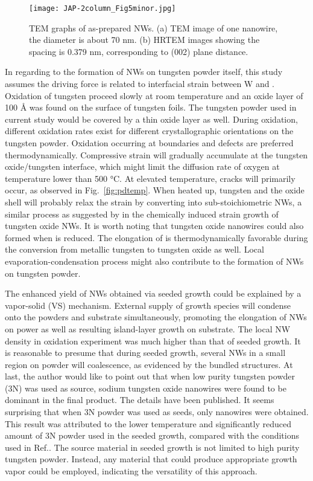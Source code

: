 \begin{figure}[htb]
\centering
\texttt{[image: JAP-2column\_Fig5minor.jpg]}
\caption[Characterization of : TEM cont]{TEM graphs of as-prepared NWs. (a) TEM image of one nanowire, the diameter is about 70 nm. (b) HRTEM images showing the spacing is 0.379 nm, corresponding to (002) plane distance.}
\label{fig:woseedtem2}
\end{figure}

In regarding to the formation of NWs on tungsten powder itself, this study assumes the driving force is related to interfacial strain between W and . Oxidation of tungsten proceed slowly at room temperature and an oxide layer of 100 \si{\angstrom} was found on the surface of tungsten foils.\cite{Warren1996} The tungsten powder used in current study would be covered by a thin oxide layer as well. During oxidation, different oxidation rates exist for different crystallographic orientations on the tungsten powder. Oxidation occurring at boundaries and defects are preferred thermodynamically.\cite{You2010} Compressive strain will gradually accumulate at the tungsten oxide/tungsten interface, which might limit the diffusion rate of oxygen at temperature lower than 500 \si{\degreeCelsius}.\cite{tungsten1999} At elevated temperature, cracks will primarily occur, as observed in Fig.~\ref{fig:pdtemp}. When heated up, tungsten and the oxide shell will probably relax the strain by converting into sub-stoichiometric NWs, a similar process as suggested by \citeauthor{Klinke2005} in the chemically induced strain growth of tungsten oxide NWs.\cite{Klinke2005} It is worth noting that tungsten oxide nanowires could also formed when  is reduced.\cite{Sarin1975} The elongation of  is thermodynamically favorable during the conversion from metallic tungsten to tungsten oxide as well. Local evaporation-condensation process might also contribute to the formation of NWs on tungsten powder.

The enhanced yield of NWs obtained via seeded growth could be explained by a vapor-solid (VS) mechanism. External supply of growth species will condense onto the powders and substrate simultaneously, promoting the elongation of NWs on power as well as resulting island-layer growth on substrate. The local NW density in oxidation experiment was much higher than that of seeded growth. It is reasonable to presume that during seeded growth, several NWs in a small region on powder will coalescence, as evidenced by the bundled structures. At last, the author would like to point out that when low purity tungsten powder (3N) was used as source, sodium tungsten oxide nanowires were found to be dominant in the final product. The details have been published.\cite{Sheng2014} It seems surprising that when 3N powder was used as seeds, only  nanowires were obtained. This result was attributed to the lower temperature and significantly reduced amount of 3N powder used in the seeded growth, compared with the conditions used in Ref.\cite{Sheng2014}. The source material in seeded growth is not limited to high purity tungsten powder. Instead, any material that could produce appropriate growth vapor could be employed, indicating the versatility of this approach.

